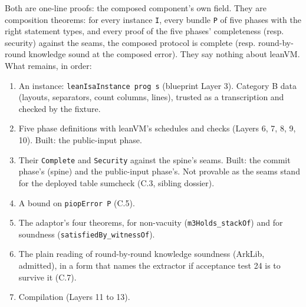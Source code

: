Both are one-line proofs: the composed component's own field. They are composition theorems: for every instance \texttt{I}, every bundle \texttt{P} of five phases with the right statement types, and every proof of the five phases' completeness (resp. security) against the seams, the composed protocol is complete (resp. round-by-round knowledge sound at the composed error). They say nothing about leanVM. What remains, in order:

\begin{enumerate}
\item An instance: \texttt{leanIsaInstance prog s} (blueprint Layer 3). Category B data (layouts, separators, count columns, lines), trusted as a transcription and checked by the fixture.
\item Five phase definitions with leanVM's schedules and checks (Layers 6, 7, 8, 9, 10). Built: the public-input phase.
\item Their \texttt{Complete} and \texttt{Security} against the spine's seams. Built: the commit phase's (spine) and the public-input phase's. Not provable as the seams stand for the deployed table sumcheck (C.3, sibling dossier).
\item A bound on \texttt{piopError P} (C.5).
\item The adaptor's four theorems, for non-vacuity (\texttt{m3Holds\_\allowbreak{}stackOf}) and for soundness (\texttt{satisfiedBy\_\allowbreak{}witnessOf}).
\item The plain reading of round-by-round knowledge soundness (ArkLib, admitted), in a form that names the extractor if acceptance test 24 is to survive it (C.7).
\item Compilation (Layers 11 to 13).
\end{enumerate}


